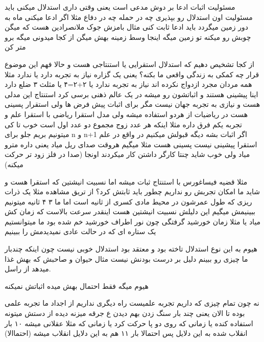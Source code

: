 \documentclass{article}
\begin{document}
		 مسئولیت اثبات ادعا بر دوش مدعی است یعنی وقتی داری استدلال میکنی باید 
		مسئولیت اون استدلال رو بپذیری چه در حمله چه در دفاع
		 مثلا اگر ادعا میکنی ماه به دور زمین میگردد باید ادعا ثابت کنی مثال بامزش جوک ملانصرادین هست که میگن چوبش رو میکنه 
		تو زمین میگه اینجا وسط زمینه بهش میگن از کجا میدونی میگه برو متر کن 
		
	 از کجا تشخیص دهیم که استدلال استقرایی یا استنتاجی هست و حالا فهم این موضوع قرار چه کمکی به زندگی واقعی ما بکنه؟
		یعنی یک گزاره نیاز به تجربه دارد یا ندارد مثلا همه مردان مجرد ازدواج نکرده اند نیاز به تجربه ندارد یا ۲+۲=۴ یا مثلث ۳ ضلع دارد
		اینا پیشینی هستند و اثباتشون رو میشه در یک عالم ذهنی برسی کرد استنتاج این مدلی هست و نیازی به تجربه جهان نیست مگر برای اثبات 
		پیش فرض ها ولی استقرار پسینی هست در ریاضیات از هردو استفاده میشه ولی مدل استقرا ریاضی با استقرا علم و تجربه یکم فرق داره مثلا
		اینکه هر عدد زوج مجموع دو عدد اول است خوب تا کی میتونیم بریم جلو برای n  و n+1 اگر اثبات بشه دیگه قبولش میکنیم در واقع در علم
		استقرا پیشینی نیست پسینی هست مثلا میگیم هروقت صدای ریل میاد یعنی داره مترو میاد ولی خوب شاید چنتا کارگر داشتن کار میکردند اونجا
		(صدا در فلز زود تر حرکت میکنه)
		
		مثلا قضیه فیساغورس با استنتاج ثبات میشه اما نسبیت انیشتین که استقرا هست و شاید ما امکان تجربش رو نداریم چطور باید ثابتش کرد؟
		از تریق مشاهده مثلا یک ذرات ریزی که طول عمرشون در محیط مادی کسری از ثانیه است اما ما ۳ ۴ ثانیه میتونیم ببینیمش میگیم این دلیلش
		نسبیت انیشتین هست اینقدر سرعت بالاست که زمان کش میاد یا مثلا زمان خورشید گرفتگی چون نور اطراف خورشید خم شده بود ما میتوانستیم
		یک ستاره ای که در حالت عادی نمیدیدمش را ببینیم
		
		 هیوم به این نوع استدلال تاخته بود و معتقد بود استدلال خوبی نیست چون اینکه چندبار ما چیزی رو ببینم دلیل بر
		درست بودنش نیست مثال حیوان و صاحبش که بهش غذا میدهد از راسل. 
		
		هیوم میگه فقط احتمال بهش میده اثباتش نمیکنه
		
		 نه چون تمام چیزی که داریم تجربه علمیست راه دیگری نداریم از اجداد ما تجربه علمی بوده تا
		الان یعنی چند بار سنگ زدن بهم دیدن ع جرقه میزنه دیده از دستش میتونه استفاده کنده یا زمانی که روی دو پا حرکت کرد یا زمانی که مثلا
		عقلانی میشه ۱۰ بار انقلاب شده به این دلایل پس احتمالا بار ۱۱ هم به این دلایل انقلاب میشه (احتماالا)
		
\end{document}

